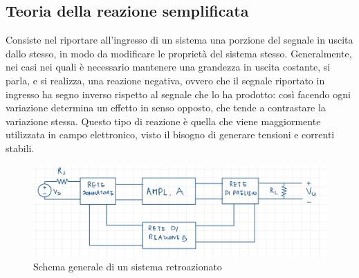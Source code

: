 \documentclass[11pt,a4paper,]{article}
\begin{document}
\subsection{Teoria della reazione semplificata}
\begin{definizione}
    Consiste nel riportare all'ingresso di un sistema una porzione del segnale in uscita dallo stesso, in modo da modificare le proprietà del sistema stesso. Generalmente, nei casi nei quali è necessario mantenere una grandezza in uscita costante, si parla, e si realizza, una reazione negativa, ovvero che il segnale riportato in ingresso ha segno inverso rispetto al segnale che lo ha prodotto: così facendo ogni variazione determina un effetto in senso opposto, che tende a contrastare la variazione stessa. Questo tipo di reazione è quella che viene maggiormente utilizzata in campo elettronico, visto il bisogno di generare tensioni e correnti stabili.
\end{definizione}
\begin{figure}
    \centering
    \includegraphics[width=0.5\linewidth]{img/schema gen segn rettr.png}
    \caption{Schema generale di un sistema retroazionato}
\end{figure}
\end{document}
